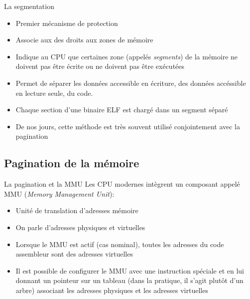 \begin{frame}[fragile=singleslide]{La segmentation}
  \begin{itemize}
    \item Premier mécanisme de protection
    \item Associe aux des droits aux zones de mémoire
    \item Indique au CPU  que certaines zone (appelés \emph{segments})
      de la mémoire ne doivent pas  être écrite ou ne doivent pas être
      exécutées
    \item Permet  de séparer les  données accessible en  écriture, des
      données accéssible en lecture seule, du code.
    \item Chaque section d'une binaire ELF est  chargé dans un
      segment séparé
    \item  De  nos  jours,  cette  méthode est  très  souvent  utilisé
      conjointement avec la pagination
  \end{itemize}
\end{frame}

\subsection{Pagination de la mémoire}

\begin{frame}{La pagination et la MMU}
  Les CPU  modernes intègrent  un composant appelé  MMU (\emph{Memory
    Management Unit}):
  \begin{itemize}
  \item  Unité de translation d'adresses mémoire
  \item  On parle d'adresses physiques et virtuelles
  \item Lorsque le  MMU est actif (cas nominal),  toutes les adresses
    du code assembleur sont des adresses virtuelles
  \item  Il est  possible de  configurer le  MMU avec  une instruction
    spéciale et  en lui  donnant un pointeur  sur un tableau  (dans la
    pratique,  il s'agit  plutôt d'un  arbre) associant  les adresses
    physiques et les adresses virtuelles
  \end{itemize}
\end{frame}



